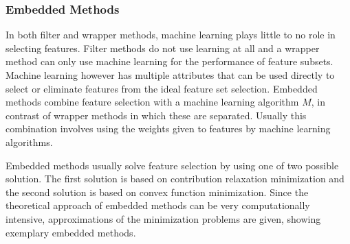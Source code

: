 	\subsubsection{Embedded Methods}
	\label{subsec:EmbeddedMethods}
	
	In both filter and wrapper methods, machine learning plays little to no role in selecting features. Filter methods do not use learning at all and a wrapper method can only use machine learning for the performance of feature subsets. Machine learning however has multiple attributes that can be used directly to select or eliminate features from the ideal feature set selection. Embedded methods combine feature selection with a machine learning algorithm $M$, in contrast of wrapper methods in which these are separated\cite{Lal2006}. Usually this combination involves using the weights given to features by machine learning algorithms\cite{blum1997selection}.
	
	Embedded methods usually solve feature selection by using one of two possible solution. The first solution is based on contribution relaxation minimization and the second solution is based on convex function minimization. Since the theoretical approach of embedded methods can be very computationally intensive, approximations of the minimization problems are given, showing exemplary embedded methods\cite{Lal2006}.
	
